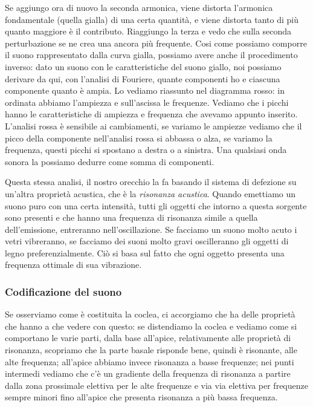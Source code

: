 \documentclass[a4paper,12pt]{article}
\begin{document}
Se aggiungo ora di nuovo la seconda armonica, viene distorta l'armonica fondamentale (quella gialla) di una certa quantità, e viene distorta tanto di più quanto maggiore è il contributo. Riaggiungo la terza e vedo che sulla seconda perturbazione se ne crea una ancora più frequente. Cosi come possiamo comporre il suono rappresentato dalla curva gialla, possiamo avere anche il procedimento inverso: dato un suono con le caratteristiche del suono giallo, noi possiamo derivare da qui, con l'analisi di Fouriere, quante componenti ho e ciascuna componente quanto è ampia. Lo vediamo riassunto nel diagramma rosso: in ordinata abbiamo l'ampiezza e sull'ascissa le frequenze. Vediamo che i picchi hanno le caratteristiche di ampiezza e frequenza che avevamo appunto inserito. L'analisi rossa è sensibile ai cambiamenti, se variamo le ampiezze vediamo che il picco della componente nell'analisi rossa si abbassa o alza, se variamo la frequenza, questi picchi si spostano a destra o a sinistra. Una qualsiasi onda sonora la possiamo dedurre come somma di componenti. 

Questa stessa analisi, il nostro orecchio la fa basando il sistema di defezione su un'altra proprietà acustica, che è la \emph{risonanza acustica}. Quando emettiamo un suono puro con una certa intensità, tutti gli oggetti che intorno a questa sorgente sono presenti e che hanno una frequenza di risonanza simile a quella dell'emissione, entreranno nell'oscillazione. Se facciamo un suono molto acuto i vetri vibreranno, se facciamo dei suoni molto gravi oscilleranno gli oggetti di legno preferenzialmente. Ciò si basa sul fatto che ogni oggetto presenta una frequenza ottimale di sua vibrazione. 
\subsubsection{Codificazione del suono}

Se osserviamo come è costituita la coclea, ci accorgiamo che ha delle proprietà che hanno a che vedere con questo: se distendiamo la coclea e vediamo come si comportano le varie parti, dalla base all'apice, relativamente alle proprietà di risonanza, scopriamo che la parte basale risponde bene, quindi è risonante, alle alte frequenza; all'apice abbiamo invece risonanza a basse frequenze; nei punti intermedi vediamo che c'è un gradiente della frequenza di risonanza a partire dalla  zona prossimale elettiva per le alte frequenze e via via elettiva per frequenze sempre minori fino all'apice che presenta risonanza a più bassa frequenza.
\end{document}
